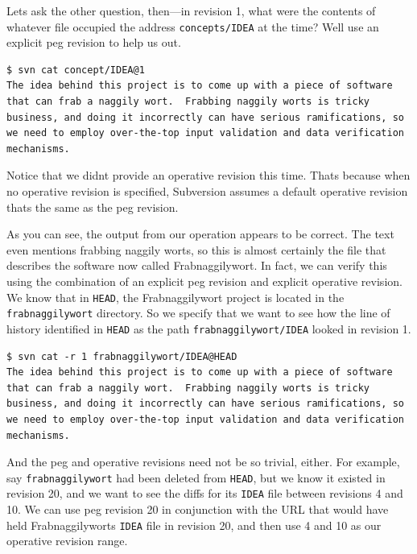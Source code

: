 Let\textquotesingle s ask the other question, then---in revision 1, what
were the contents of whatever file occupied the address
\texttt{concepts/IDEA} at the time? We\textquotesingle ll use an
explicit peg revision to help us out.

\begin{verbatim}
$ svn cat concept/IDEA@1
The idea behind this project is to come up with a piece of software
that can frab a naggily wort.  Frabbing naggily worts is tricky
business, and doing it incorrectly can have serious ramifications, so
we need to employ over-the-top input validation and data verification
mechanisms.
\end{verbatim}

Notice that we didn\textquotesingle t provide an operative revision this
time. That\textquotesingle s because when no operative revision is
specified, Subversion assumes a default operative revision
that\textquotesingle s the same as the peg revision.

As you can see, the output from our operation appears to be correct. The
text even mentions frabbing naggily worts, so this is almost certainly
the file that describes the software now called Frabnaggilywort. In
fact, we can verify this using the combination of an explicit peg
revision and explicit operative revision. We know that in \texttt{HEAD},
the Frabnaggilywort project is located in the \texttt{frabnaggilywort}
directory. So we specify that we want to see how the line of history
identified in \texttt{HEAD} as the path \texttt{frabnaggilywort/IDEA}
looked in revision 1.

\begin{verbatim}
$ svn cat -r 1 frabnaggilywort/IDEA@HEAD
The idea behind this project is to come up with a piece of software
that can frab a naggily wort.  Frabbing naggily worts is tricky
business, and doing it incorrectly can have serious ramifications, so
we need to employ over-the-top input validation and data verification
mechanisms.
\end{verbatim}

And the peg and operative revisions need not be so trivial, either. For
example, say \texttt{frabnaggilywort} had been deleted from
\texttt{HEAD}, but we know it existed in revision 20, and we want to see
the diffs for its \texttt{IDEA} file between revisions 4 and 10. We can
use peg revision 20 in conjunction with the URL that would have held
Frabnaggilywort\textquotesingle s \texttt{IDEA} file in revision 20, and
then use 4 and 10 as our operative revision range.

